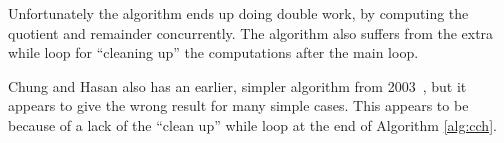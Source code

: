 Unfortunately the algorithm ends up doing double work, by computing the quotient and remainder concurrently.
The algorithm also suffers from the extra while loop for ``cleaning up'' the computations after the main loop.





Chung and Hasan also has an earlier, simpler algorithm from 2003~\cite{chung2003more},
but it appears to give the wrong result for many simple cases.
This appears to be because of a lack of the ``clean up'' while loop at the end of Algorithm \ref{alg:cch}.








